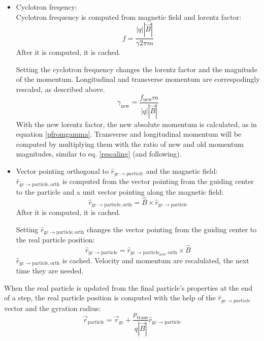 \begin{itemize}
	
		\item Cyclotron freqency:\\
		Cyclotron frequency is computed from magnetic field and lorentz factor:
		\begin{equation}
			f = \frac{|q| |\vec{B}|}{\gamma 2 \pi m}
		\end{equation}
		After it is computed, it is cached.  
            
		Setting the cyclotron frequency changes the lorentz factor and the magnitude of the momentum. Longitudinal and transverse momentum are correspodingly rescaled, as described above. 
		\begin{equation}
			\gamma_{\mathrm{new}} = \frac{f_{\mathrm{new}} m}{|q| |\vec{B}|} 
		\end{equation}
		With the new lorentz factor, the new absolute momentum is calculated, as in equation \ref{pfromgamma}. Transverse and longitudinal momentum will be computed by multiplying them with the ratio of new and old momentum magnitudes, similar to eq. \ref{rescaling} (and following).

		\item Vector pointing orthogonal to $\hat{r}_{gc \rightarrow particle}$ and the magnetic field:  \\
		$\hat{r}_{\mathrm{gc \rightarrow particle, orth}}$ is computed from the vector pointing from the guiding center to the particle and a unit vector pointing along the magnetic field:
		\begin{equation}
			\hat{r}_{\mathrm{gc \rightarrow particle, orth}} = \hat{B}\times \hat{r}_{\mathrm{gc \rightarrow particle}}
		\end{equation}
		After it is computed, it is cached.  
		
		Setting $\hat{r}_{\mathrm{gc \rightarrow particle, orth}}$ changes the vector pointing from the guiding center to the real particle position: 
		\begin{equation}
			\hat{r}_{\mathrm{gc \rightarrow particle}} = \hat{r}_{\mathrm{gc \rightarrow particle_{new}, orth}} \times \hat{B}
		\end{equation}
		$\hat{r}_{\mathrm{gc \rightarrow particle, orth}}$ is cached. Velocity and momentum are recalulated, the next time they are needed.
	
	\end{itemize}

		
	When the real particle is updated from the final particle's properties at the end of a step, the real particle position is computed with the help of the $\hat{r}_{gc \rightarrow particle}$ vector and the gyration radius:
	\begin{equation}
		\vec{r}_{\mathrm{particle}} = \vec{r}_{\mathrm{gc}} + \frac{p_{\mathrm{trans}}}{q |\vec{B}|} \hat{r}_{\mathrm{gc \rightarrow particle}}
	\end{equation}
	
